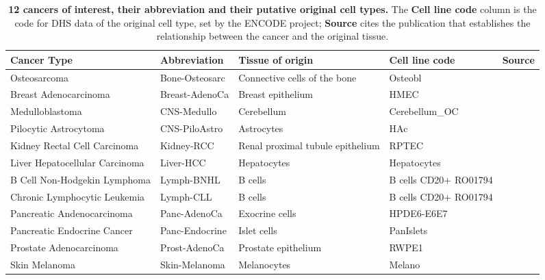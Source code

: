 \begin{table}[hp!]
\centering
\caption{\textbf{12 cancers of interest, their abbreviation and their putative original cell types.} The \textbf{Cell line code} column is the code for DHS data of the original cell type, set by the ENCODE project; \textbf{Source} cites the publication that establishes the relationship between the cancer and the original tissue.}
\label{tab:encode}
\begin{tabulary}{\textwidth}{ LlLLR }
\toprule
\bf{Cancer Type} & \bf{Abbreviation} & \bf{Tissue of origin} & \textbf{Cell line code} & \bf{Source} \\
\toprule
Osteosarcoma & Bone-Osteosarc & Connective cells of the bone & Osteobl & \citet{Alfranca2015BoneDevelopment} \\ \hline

Breast Adenocarcinoma & Breast-AdenoCa & Breast epithelium & HMEC & \citet{Boyce2007BreastCancer} \\ \hline

Medulloblastoma &  CNS-Medullo &  Cerebellum & Cerebellum\_OC & \citet{Penas2015TheMedulloblastoma} \\ \hline

Pilocytic Astrocytoma & CNS-PiloAstro & Astrocytes & HAc & \citet{Collins2015PilocyticMarkers}\\ \hline

Kidney Rectal Cell Carcinoma & Kidney-RCC & Renal proximal tubule epithelium & RPTEC & \citet{Hsieh2017RenalCarcinoma} \\ \hline

Liver Hepatocellular Carcinoma & Liver-HCC & Hepatocytes & Hepatocytes & \citet{Gissen2015StructuralDisease} \\ \hline

B Cell Non-Hodgekin Lymphoma & Lymph-BNHL & B cells & B cells CD20+ RO01794 & \citet{Shankland2012Non-HodgkinLymphoma} \\ \hline

Chronic Lymphocytic Leukemia & Lymph-CLL & B cells & B cells CD20+ RO01794 & \citet{Hallek2018ChronicLeukaemia} \\ \hline

Pancreatic Andenocarcinoma & Panc-AdenoCa & Exocrine cells & HPDE6-E6E7 & \citet{Vareedayah2018PancreaticAdenocarcinoma} \\ \hline

Pancreatic Endocrine Cancer & Panc-Endocrine & Islet cells & PanIslets & \citet{Nakakura2007IsletRegion} \\ \hline

Prostate Adenocarcinoma & Prost-AdenoCa & Prostate epithelium & RWPE1 & \citet{Lee2011OverviewPathology} \\ \hline

Skin Melanoma & Skin-Melanoma & Melanocytes &  Melano & \cite{Lin2007MelanocytePigmentation} \\
\bottomrule

\end{tabulary}
\end{table}

